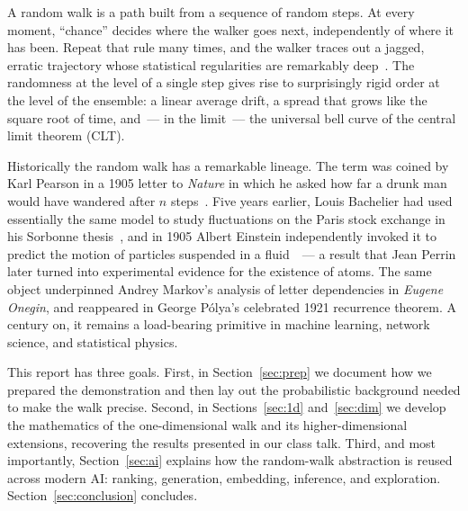 \documentclass[conference,a4paper,10pt]{IEEEtran}
\begin{document}
A random walk is a path built from a sequence of random steps. At every
moment, ``chance'' decides where the walker goes next, independently of
where it has been. Repeat that rule many times, and the walker traces out a
jagged, erratic trajectory whose statistical regularities are remarkably
deep~\cite{spitzer2001random,lawler2010random}. The randomness at the level
of a single step gives rise to surprisingly rigid order at the level of the
ensemble: a linear average drift, a spread that grows like the square root
of time, and~--- in the limit~--- the universal bell curve of the central
limit theorem (CLT).

Historically the random walk has a remarkable lineage. The term was
coined by Karl Pearson in a 1905 letter to \emph{Nature} in which he asked
how far a drunk man would have wandered after $n$ steps~\cite{pearson1905}.
Five years
earlier, Louis Bachelier had used essentially the same model to study
fluctuations on the Paris stock exchange in his Sorbonne thesis~\cite{bachelier1900}, and in
1905 Albert Einstein independently invoked it to predict the motion of
particles suspended in a fluid~\cite{einstein1905}~--- a result that Jean Perrin later turned
into experimental evidence for the existence of atoms. The same object
underpinned Andrey Markov's analysis of letter dependencies in
\emph{Eugene Onegin}, and reappeared in George P\'{o}lya's celebrated 1921
recurrence theorem. A century on, it remains a load-bearing primitive in
machine learning, network science, and statistical physics.

This report has three goals. First, in Section~\ref{sec:prep} we document
how we prepared the demonstration and then lay out the probabilistic
background needed to make the walk precise. Second, in
Sections~\ref{sec:1d} and~\ref{sec:dim} we develop the mathematics of the
one-dimensional walk and its higher-dimensional extensions, recovering the
results presented in our class talk. Third, and most importantly,
Section~\ref{sec:ai} explains how the random-walk abstraction is reused
across modern AI: ranking, generation, embedding, inference, and
exploration. Section~\ref{sec:conclusion} concludes.

\end{document}
